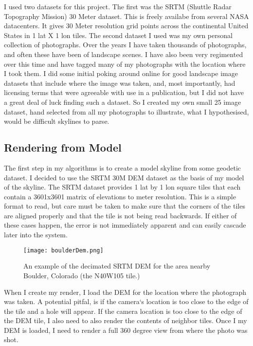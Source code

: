 \documentclass{acm_proc_article-sp}
\begin{document}
	I used two datasets for this project.  The first was the SRTM (Shuttle Radar Topography Mission) 30 Meter dataset.  This is freely availabe from several NASA datacenters.  It gives 30 Meter resolution grid points across the continental United States in 1 lat X 1 lon tiles.  The second dataset I used was my own personal collection of photographs.  Over the years I have taken thousands of photographs, and often these have been of landscape scenes.  I have also been very regimented over this time and have tagged many of my photographs with the location where I took them.  I did some initial poking around online for good landscape image datasets that include where the image was taken, and, most importantly, had licensing terms that were agreeable with use in a publication, but I did not have a great deal of luck finding such a dataset.  So I created my own small 25 image dataset, hand selected from all my photographs to illustrate, what I hypothesised, would be difficult skylines to parse.
\subsection{Rendering from Model}
The first step in my algorithms is to create a model skyline from some geodetic dataset.  I decided to use the  SRTM 30M DEM dataset as the basis of my model of the skyline.  The SRTM dataset provides 1 lat by 1 lon square tiles that each contain a 3601x3601 matrix of elevations to meter resolution. \cite{farr2007shuttle} This is a simple format to read, but care must be taken to make sure that the corners of the tiles are aligned properly and that the tile is not being read backwards. If either of these cases happen, the error is not immediately apparent and can easily cascade later into the system.  
\begin{figure}
	\centering
	\texttt{[image: boulderDem.png]}
	\caption{An example of the decimated SRTM DEM for the area nearby Boulder, Colorado (the N40W105 tile.)}
	\label{fig:bldrDem}
\end{figure}

When I create my render, I load the DEM for the location where the photograph was taken.   A potential pitfal, is if the camera`s location is too close to the edge of the tile and a hole will appear.  If the camera location is too close to the edge of the DEM tile, I also need to also render the contents of neighbor tiles.  Once I my DEM is loaded, I need to render a full 360 degree view from where the photo was shot.  
\end{document}
